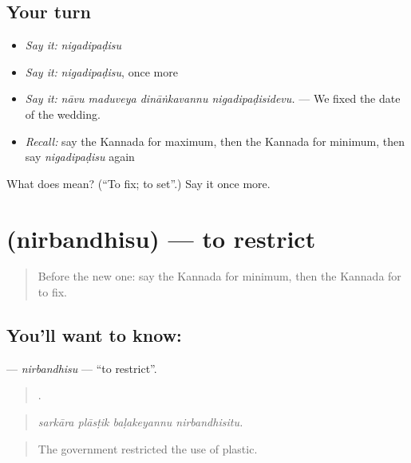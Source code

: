 \subsection*{Your turn}
\begin{itemize}
\raggedright
  \item \emph{Say it:} \emph{nigadipaḍisu}
  \item \emph{Say it:} \emph{nigadipaḍisu}, once more
  \item \emph{Say it:} \emph{nāvu maduveya dināṅkavannu nigadipaḍisidevu.} — We fixed the date of the wedding.
  \item \emph{Recall:} say the Kannada for maximum, then the Kannada for minimum, then say \emph{nigadipaḍisu} again
\end{itemize}

\begin{tcolorbox}[breakable,colback=teal!4,colframe=teal!35!black,title={Before you move on}]
What does  mean? (\textquotedblleft{}To fix; to set\textquotedblright{}.) Say it once more.
\end{tcolorbox}
\section[\texorpdfstring{\kn{ನಿರ್ಬಂಧಿಸು} (nirbandhisu)}{ನಿರ್ಬಂಧಿಸು (nirbandhisu)}]{ (nirbandhisu) — to restrict}

\label{lesson:KA-C414-nirbandhisu}



\begin{quote}
Before the new one: say the Kannada for minimum, then the Kannada for to fix.
\end{quote}

\subsection*{You'll want to know: }
\textbf{} — \emph{nirbandhisu} — \textquotedblleft{}to restrict\textquotedblright{}.

\begin{quote}
   .
\end{quote}

\begin{quote}
\emph{sarkāra plāsṭik baḷakeyannu nirbandhisitu.}
\end{quote}

\begin{quote}
The government restricted the use of plastic.
\end{quote}

